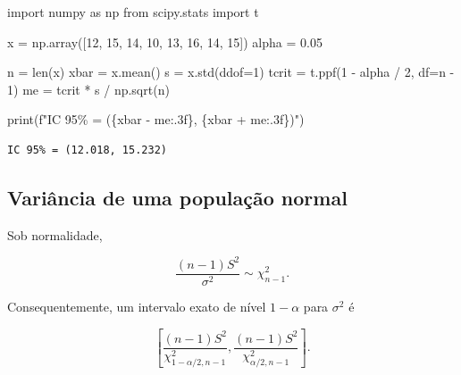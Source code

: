 \documentclass[
  letterpaper,
  DIV=11,
  numbers=noendperiod]{scrreprt}
\newenvironment{Shaded}{\begin{snugshade}}{\end{snugshade}}
\newcommand{\BuiltInTok}[1]{\textcolor[rgb]{0.00,0.23,0.31}{#1}}
\newcommand{\DecValTok}[1]{\textcolor[rgb]{0.68,0.00,0.00}{#1}}
\newcommand{\FloatTok}[1]{\textcolor[rgb]{0.68,0.00,0.00}{#1}}
\newcommand{\ImportTok}[1]{\textcolor[rgb]{0.00,0.46,0.62}{#1}}
\newcommand{\NormalTok}[1]{\textcolor[rgb]{0.00,0.23,0.31}{#1}}
\newcommand{\OperatorTok}[1]{\textcolor[rgb]{0.37,0.37,0.37}{#1}}
\newcommand{\SpecialCharTok}[1]{\textcolor[rgb]{0.37,0.37,0.37}{#1}}
\newcommand{\SpecialStringTok}[1]{\textcolor[rgb]{0.13,0.47,0.30}{#1}}
\begin{document}
\begin{Shaded}
\begin{Highlighting}[]
\ImportTok{import}\NormalTok{ numpy }\ImportTok{as}\NormalTok{ np}
\ImportTok{from}\NormalTok{ scipy.stats }\ImportTok{import}\NormalTok{ t}

\NormalTok{x }\OperatorTok{=}\NormalTok{ np.array([}\DecValTok{12}\NormalTok{, }\DecValTok{15}\NormalTok{, }\DecValTok{14}\NormalTok{, }\DecValTok{10}\NormalTok{, }\DecValTok{13}\NormalTok{, }\DecValTok{16}\NormalTok{, }\DecValTok{14}\NormalTok{, }\DecValTok{15}\NormalTok{])}
\NormalTok{alpha }\OperatorTok{=} \FloatTok{0.05}

\NormalTok{n }\OperatorTok{=} \BuiltInTok{len}\NormalTok{(x)}
\NormalTok{xbar }\OperatorTok{=}\NormalTok{ x.mean()}
\NormalTok{s }\OperatorTok{=}\NormalTok{ x.std(ddof}\OperatorTok{=}\DecValTok{1}\NormalTok{)}
\NormalTok{tcrit }\OperatorTok{=}\NormalTok{ t.ppf(}\DecValTok{1} \OperatorTok{{-}}\NormalTok{ alpha }\OperatorTok{/} \DecValTok{2}\NormalTok{, df}\OperatorTok{=}\NormalTok{n }\OperatorTok{{-}} \DecValTok{1}\NormalTok{)}
\NormalTok{me }\OperatorTok{=}\NormalTok{ tcrit }\OperatorTok{*}\NormalTok{ s }\OperatorTok{/}\NormalTok{ np.sqrt(n)}

\BuiltInTok{print}\NormalTok{(}\SpecialStringTok{f"IC 95\% = (}\SpecialCharTok{\{}\NormalTok{xbar }\OperatorTok{{-}}\NormalTok{ me}\SpecialCharTok{:.3f\}}\SpecialStringTok{, }\SpecialCharTok{\{}\NormalTok{xbar }\OperatorTok{+}\NormalTok{ me}\SpecialCharTok{:.3f\}}\SpecialStringTok{)"}\NormalTok{)}
\end{Highlighting}
\end{Shaded}

\begin{verbatim}
IC 95% = (12.018, 15.232)
\end{verbatim}

\subsection{Variância de uma população
normal}\label{variuxe2ncia-de-uma-populauxe7uxe3o-normal}

Sob normalidade,

\[\frac{(n-1)S^2}{\sigma^2}\sim\chi^2_{n-1}.\]

Consequentemente, um intervalo exato de nível \(1-\alpha\) para
\(\sigma^2\) é

\[\boxed{
\left[
\frac{(n-1)S^2}{\chi^2_{1-\alpha/2,n-1}},
\frac{(n-1)S^2}{\chi^2_{\alpha/2,n-1}}
\right]
}.\]
\end{document}
